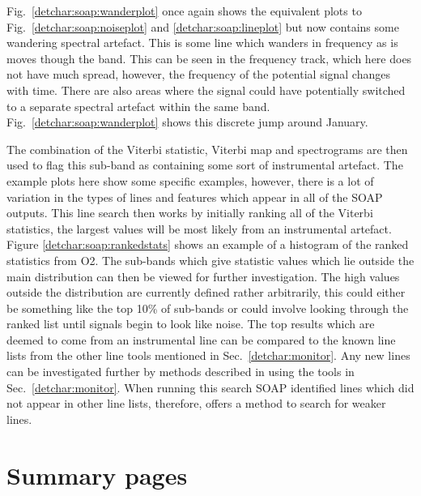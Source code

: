 Fig.~\ref{detchar:soap:wanderplot} once again shows the equivalent plots to Fig.~\ref{detchar:soap:noiseplot} and \ref{detchar:soap:lineplot} but now contains some wandering spectral artefact. 
This is some line which wanders in frequency as is moves though the band. 
This can be seen in the frequency track, which here does not have much spread, however, the frequency of the potential signal changes with time. 
There are also areas where the signal could have potentially switched to a separate spectral artefact within the same band. Fig.~\ref{detchar:soap:wanderplot} shows this discrete jump around January. 

The combination of the Viterbi statistic, Viterbi map and spectrograms are then used to flag this sub-band as containing some sort of instrumental artefact. 
The example plots here show some specific examples, however, there is a lot of variation in the types of lines and features which appear in all of the SOAP outputs.
This line search then works by initially ranking all of the Viterbi statistics, the largest values will be most likely from an instrumental artefact. 
Figure \ref{detchar:soap:rankedstats} shows an example of a histogram of the ranked statistics from O2.
The sub-bands which give statistic values which lie outside the main distribution can then be viewed for further investigation. The high values outside the distribution are currently defined rather arbitrarily, this could either be something like the top 10\% of sub-bands or could involve looking through the ranked list until signals begin to look like noise. 
The top results which are deemed to come from an instrumental line can be compared to the known line lists from the other line tools mentioned in Sec.~\ref{detchar:monitor}.
Any new lines can be investigated further by methods described in \citep{covas2018IdentificationMitigation} using the tools in Sec.~\ref{detchar:monitor}.
When running this search SOAP identified lines which did not appear in other line lists, therefore, offers a method to search for weaker lines. 



\section{\label{detchar:summary}Summary pages}

